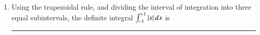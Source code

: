 \documentclass[journal]{IEEEtran}
\begin{document}
\begin{enumerate}
\begin{multicols}{2}
\begin{enumerate}
\item $0.18$
\item $0.36$
\item $0.54$
\item $0.6$
\end{enumerate}
\end{multicols}


\item Using the trapezoidal rule, and dividing the interval of integration into three equal subintervals, the definite integral $\int_{-1}^{+1}\left\vert x\right\vert dx$ is \rule{1cm}{0.15mm}
\end{enumerate}
\end{document}
